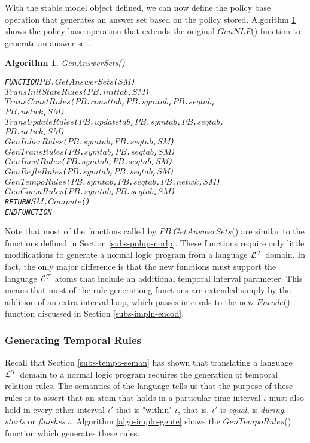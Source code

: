 \documentclass[11pt]{report}
\newenvironment{vverbatim}
{
  \begin{alltt}
}
{
    \vspace{-\baselineskip}
  \end{alltt}
}
\newtheorem{vvalgorithm}{Algorithm}[chapter]
\newenvironment{valgorithm}[2]
{
  \begin{vvalgorithm}{#1}
    \label{#2}
    \small
    \begin{vverbatim}
}
{
    \end{vverbatim}
  \end{vvalgorithm}
}
\begin{document}
        With the stable model object defined, we can now define the policy
        base operation that generates an answer set based on the policy
        stored. Algorithm \ref{algo-impln-genas} shows the policy base
        operation that extends the original $GenNLP$() function to
        generate an answer set.

        \begin{valgorithm}{GenAnswerSets()}{algo-impln-genas}
FUNCTION \(PB\).\(GetAnswerSets\)(\(SM\))
  \(TransInitStateRules\)(\(PB\).\(inittab\), \(SM\))
  \(TransConstRules\)(\(PB\).\(consttab\), \(PB\).\(symtab\), \(PB\).\(seqtab\),
    \(PB\).\(netwk\), \(SM\))
  \(TransUpdateRules\)(\(PB\).\(updatetab\), \(PB\).\(symtab\), \(PB\).\(seqtab\),
    \(PB\).\(netwk\), \(SM\))
  \(GenInherRules\)(\(PB\).\(symtab\), \(PB\).\(seqtab\), \(SM\))
  \(GenTransRules\)(\(PB\).\(symtab\), \(PB\).\(seqtab\), \(SM\))
  \(GenInertRules\)(\(PB\).\(symtab\), \(PB\).\(seqtab\), \(SM\))
  \(GenRefleRules\)(\(PB\).\(symtab\), \(PB\).\(seqtab\), \(SM\))
  \(GenTempoRules\)(\(PB\).\(symtab\), \(PB\).\(seqtab\), \(PB\).\(netwk\), \(SM\))
  \(GenConsiRules\)(\(PB\).\(symtab\), \(PB\).\(seqtab\), \(SM\))
  RETURN \(SM\).\(Compute\)()
ENDFUNCTION
        \end{valgorithm}

        Note that most of the functions called by \(PB\).\(GetAnswerSets\)()
        are similar to the functions defined in Section
        \ref{subs-polup-norlp}. These functions require only little
        modifications to generate a normal logic program from a language
        ${\cal L^T}$ domain. In fact, the only major difference is
        that the new functions must support the language ${\cal L^T}$ atoms
        that include an additional temporal interval parameter. This means
        that most of the rule-generationg functions are extended simply by
        the addition of an extra interval loop, which passes intervals to the
        new $Encode$() function discussed in Section \ref{subs-impln-encod}.

        \subsubsection{Generating Temporal Rules}

          Recall that Section \ref{subs-tempo-seman} has shown that translating
          a language ${\cal L^T}$ domain to a normal logic program requires the
          generation of temporal relation rules. The semantics of the language
          tells us that the purpose of these rules is to assert that an atom
          that holds in a particular time interval $\iota$ must also hold in
          every other interval $\iota'$ that is "within" $\iota$, that is,
          $\iota'$ is {\em equal}, is {\em during}, {\em starts} or
          {\em finishes} $\iota$. Algorithm \ref{algo-impln-gente} shows the
          $GenTempoRules$() function which generates these rules.
\end{document}
